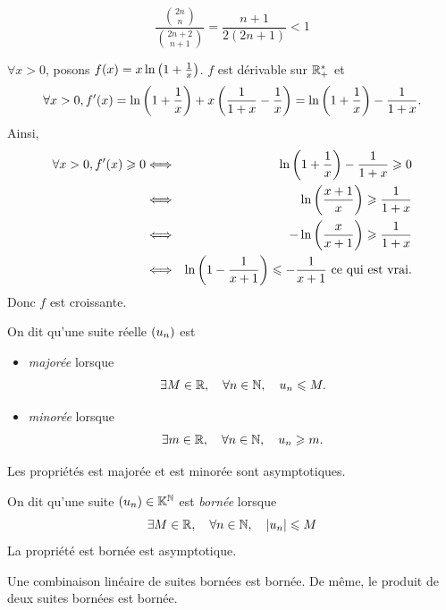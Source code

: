 \documentclass{magnoliaold}
\begin{document}
\begin{sol}
\[\frac{\binom{2n}{n}}{\binom{2n+2}{n+1}}=\frac{n+1}{2(2n+1)}<1\]

$\forall x>0$, posons $f(x)=x\ln\left(1+\frac{1}{x}\right)$.
$f$ est dérivable sur $\mathbb{R}_+^*$ et 
\[\forall x>0, f'(x)=\ln\left(1+\frac{1}{x}\right)+x\left(\frac{1}{1+x}-\frac{1}{x}\right)=\ln\left(1+\frac{1}{x}\right)-\frac{1}{1+x}.\]
Ainsi,
\begin{eqnarray*}
\forall x>0, f'(x)\geqslant0 &\Longleftrightarrow & \ln\left(1+\frac{1}{x}\right)-\frac{1}{1+x}\geqslant 0\\
&\Longleftrightarrow & \ln\left(\frac{x+1}{x}\right)\geqslant\frac{1}{1+x}\\
&\Longleftrightarrow & -\ln\left(\frac{x}{x+1}\right)\geqslant\frac{1}{1+x}\\
&\Longleftrightarrow & \ln\left(1-\frac{1}{x+1}\right)\leqslant-\frac{1}{x+1} \text{ ce qui est vrai.}
\end{eqnarray*}
Donc $f$ est croissante.
\end{sol}



\begin{definition}[utile=-3]
On dit qu'une suite réelle $\left(u_n\right)$ est
\begin{itemize}
\item \emph{majorée} lorsque
  \[\exists M\in\mathbb{R} ,\quad \forall n\in\mathbb{N} ,\quad u_n \leqslant M.\]
\item \emph{minorée} lorsque
  \[\exists m\in\mathbb{R} ,\quad \forall n\in\mathbb{N} ,\quad u_n \geqslant m.\]
\end{itemize}
Les propriétés \og est majorée \fg et \og est minorée \fg sont asymptotiques.
\end{definition}

\begin{definition}[utile=-3]
On dit qu'une suite $\left(u_n\right)\in\mathbb{K}^{\mathbb{N}}$ est \emph{bornée} lorsque
\[\exists M\in\mathbb{R} ,\quad \forall n\in\mathbb{N} ,\quad \left|u_n\right| \leqslant M\]
La propriété \og est bornée \fg est asymptotique.
\end{definition}

\begin{remarqueUnique}
\remarque Une combinaison linéaire de suites bornées est bornée. De même, le
  produit de deux suites bornées est bornée.
\end{remarqueUnique}
\end{document}
